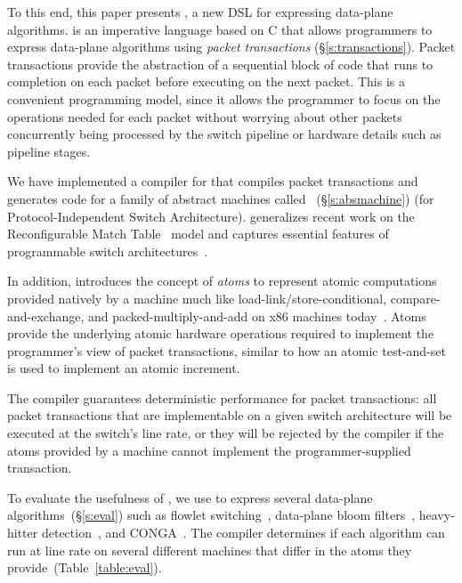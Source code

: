 To this end, this paper presents \pktlanguage, a new DSL for expressing data-plane
algorithms. \pktlanguage is an imperative language based on C that allows
programmers to express data-plane algorithms using {\em packet transactions}
(\S\ref{s:transactions}).  Packet transactions provide the abstraction of a
sequential block of code that runs to completion on each packet before
executing on the next packet. This is a convenient programming model, since it
allows the programmer to focus on the operations needed for each packet without
worrying about other packets concurrently being processed by the switch
pipeline or hardware details such as pipeline stages.

We have implemented a compiler for \pktlanguage that compiles \pktlanguage
packet transactions and generates code for a family of abstract machines called
\absmachine~(\S\ref{s:absmachine}) (for Protocol-Independent Switch
Architecture). \absmachine generalizes recent work on the Reconfigurable Match
Table~\cite{rmt} model and captures essential features of programmable switch
architectures~\cite{rmt, xpliant, flexpipe}.

In addition, \absmachine introduces the concept of {\em atoms} to represent
atomic computations provided natively by a \absmachine machine much like
load-link/store-conditional, compare-and-exchange, and packed-multiply-and-add
on x86 machines today~\cite{x86_manual}.  Atoms provide the underlying atomic
hardware operations required to implement the programmer's view of packet
transactions, similar to how an atomic test-and-set is used to implement an
atomic increment.

The \pktlanguage compiler guarantees deterministic performance for packet
transactions: all packet transactions that are implementable on a given switch
architecture will be executed at the switch's line rate, or they will be
rejected by the compiler if the atoms provided by a \absmachine machine cannot
implement the programmer-supplied transaction.

To evaluate the usefulness of \pktlanguage, we use \pktlanguage to express
several data-plane algorithms~(\S\ref{s:eval}) such as flowlet
switching~\cite{flowlets}, data-plane bloom filters~\cite{bloom}, heavy-hitter
detection~\cite{opensketch}, and CONGA~\cite{conga}.  The \pktlanguage compiler
determines if each algorithm can run at line rate on several different
\absmachine machines that differ in the atoms they
provide~(Table~\ref{table:eval}).
